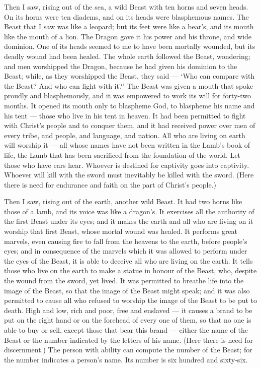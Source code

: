 Then I saw, rising out of the sea, a wild Beast with ten
horns and seven heads. On its horns were ten diadems, and on its heads
were blasphemous names.  The Beast that I saw was like a
leopard; but its feet were like a bear's, and its mouth like the mouth
of a lion. The Dragon gave it his power and his throne, and wide
dominion.  One of its heads seemed to me to have been
mortally wounded, but its deadly wound had been healed. The whole earth
followed the Beast, wondering;  and men worshipped the
Dragon, because he had given his dominion to the Beast; while, as they
worshipped the Beast, they said --- `Who can compare with the Beast? And
who can fight with it?'  The Beast was given a mouth that
spoke proudly and blasphemously, and it was empowered to work its will
for forty-two months.  It opened its mouth only to blaspheme
God, to blaspheme his name and his tent --- those who live in his tent
in heaven.  It had been permitted to fight with Christ's
people and to conquer them, and it had received power over men of every
tribe, and people, and language, and nation.  All who are
living on earth will worship it --- all whose names have not been
written in the Lamb's book of life, the Lamb that has been sacrificed
from the foundation of the world.  Let those who have ears
hear.  Whoever is destined for captivity goes into
captivity. Whoever will kill with the sword must inevitably be killed
with the sword. (Here there is need for endurance and faith on the part
of Christ's people.)

 Then I saw, rising out of the earth, another wild Beast.
It had two horns like those of a lamb, and its voice was like a
dragon's.  It exercises all the authority of the first
Beast under its eyes; and it makes the earth and all who are living on
it worship that first Beast, whose mortal wound was healed.
 It performs great marvels, even causing fire to fall from
the heavens to the earth, before people's eyes;  and in
consequence of the marvels which it was allowed to perform under the
eyes of the Beast, it is able to deceive all who are living on the
earth. It tells those who live on the earth to make a statue in honour
of the Beast, who, despite the wound from the sword, yet lived.
 It was permitted to breathe life into the image of the
Beast, so that the image of the Beast might speak; and it was also
permitted to cause all who refused to worship the image of the Beast to
be put to death.  High and low, rich and poor, free and
enslaved --- it causes a brand to be put on the right hand or on the
forehead of every one of them,  so that no one is able to
buy or sell, except those that bear this brand --- either the name of
the Beast or the number indicated by the letters of his name.
 (Here there is need for discernment.) The person with
ability can compute the number of the Beast; for the number indicates a
person's name. Its number is six hundred and sixty-six.

